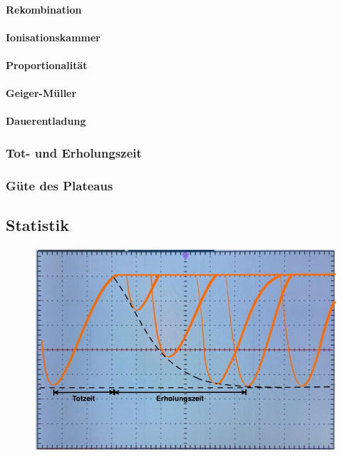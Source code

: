 \paragraph{Rekombination}

\paragraph{Ionisationskammer}

\paragraph{Proportionalität}

\paragraph{Geiger-Müller}

\paragraph{Dauerentladung}

\subsubsection{Tot- und Erholungszeit}

\subsubsection{Güte des Plateaus}

\subsection{Statistik}

\begin{figure}[H]
	\centering
	\includegraphics[width=0.5\linewidth]{content/grafik/zeit_soll.jpg}
	\caption{}
	\label{fig:zeit_soll}
\end{figure}

